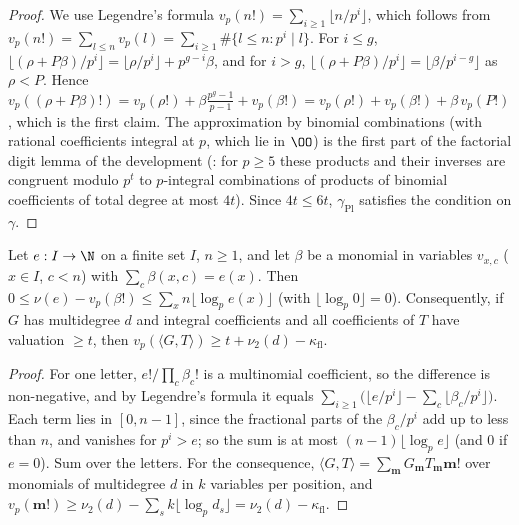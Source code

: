 \begin{proof}
We use Legendre's formula $v_p(n!)=\sum_{i\ge1}\lfloor n/p^i\rfloor$, which follows from
$v_p(n!)=\sum_{l\le n}v_p(l)=\sum_{i\ge1}\#\{l\le n:p^i\mid l\}$. For $i\le g$,
$\lfloor(\rho+P\beta)/p^i\rfloor=\lfloor\rho/p^i\rfloor+p^{g-i}\beta$, and for $i>g$, $\lfloor(\rho+P\beta)/p^i\rfloor=\lfloor\beta/p^{i-g}\rfloor$ as
$\rho<P$. Hence $v_p((\rho+P\beta)!)=v_p(\rho!)+\beta\frac{p^g-1}{p-1}+v_p(\beta!)=v_p(\rho!)+v_p(\beta!)+\beta\,v_p(P!)$, which is the first
claim. The approximation by binomial combinations (with rational coefficients integral at $p$, which lie in $\OO$) is the first
part of the factorial digit lemma of the development (:
for $p\ge5$ these products and their inverses are congruent modulo $p^t$ to $p$-integral combinations of products of binomial
coefficients of total degree at most $4t$). Since $4t\le6t$, $\gamma_{\mathrm{Pl}}$ satisfies the condition on $\gamma$.
\end{proof}

\begin{lemma}\label{pf:linkG:multinomial}
Let $e:I\to\N$ on a finite set $I$, $n\ge1$, and let $\beta$ be a monomial in variables $v_{x,c}$ ($x\in I$, $c<n$) with
$\sum_c\beta(x,c)=e(x)$. Then $0\le\nu(e)-v_p(\beta!)\le\sum_xn\lfloor\log_pe(x)\rfloor$ (with $\lfloor\log_p0\rfloor=0$). Consequently, if $G$ has multidegree $d$ and integral
coefficients and all coefficients of $T$ have valuation $\ge t$, then $v_p(\langle G,T\rangle)\ge t+\nu_2(d)-\kappa_{\mathrm{fl}}$.
\end{lemma}

\begin{proof}
For one letter, $e!/\prod_c\beta_c!$ is a multinomial coefficient, so the difference is non-negative, and by Legendre's formula it equals
$\sum_{i\ge1}\bigl(\lfloor e/p^i\rfloor-\sum_c\lfloor\beta_c/p^i\rfloor\bigr)$. Each term lies in $[0,n-1]$, since the fractional parts of the
$\beta_c/p^i$ add up to less than $n$, and vanishes for $p^i>e$; so the sum is at most $(n-1)\lfloor\log_pe\rfloor$ (and $0$ if $e=0$). Sum over
the letters. For the consequence, $\langle G,T\rangle=\sum_{\mathbf m}G_{\mathbf m}T_{\mathbf m}\mathbf m!$ over monomials of multidegree $d$ in $k$
variables per position, and $v_p(\mathbf m!)\ge\nu_2(d)-\sum_sk\lfloor\log_pd_s\rfloor=\nu_2(d)-\kappa_{\mathrm{fl}}$.
\end{proof}

